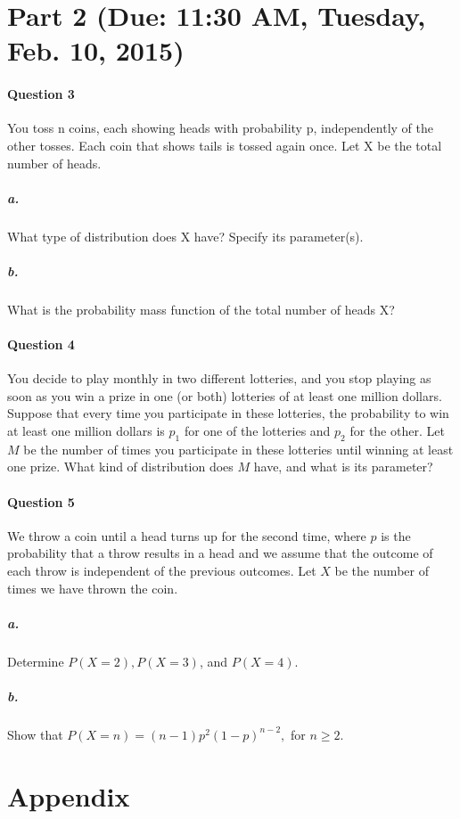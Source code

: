 \documentclass[11pt]{article} %
\begin{document}
\vspace{8em}
\section{Part 2 (Due: 11:30 AM, Tuesday, Feb. 10, 2015)}
\paragraph*{\bf Question 3}
You toss n coins, each showing heads with probability p, independently of the other tosses. Each coin that shows tails is tossed again once. Let X be the total number of heads. 

\subparagraph*{a.} What type of distribution does X have? Specify its parameter(s). 
\subparagraph*{b.} What is the probability mass function of the total number of heads X?

\paragraph*{\bf Question 4}
You decide to play monthly in two different lotteries, and you stop playing as soon as you win a prize in one (or both) lotteries of
at least one million dollars. Suppose that every time you participate in these lotteries, the probability to win at least one million dollars is $p_1$ for one of the lotteries and $p_2$ for the other. Let $M$ be the number of times you participate in these lotteries until winning at least one prize. What kind of distribution does $M$ have, and what is its parameter?

\paragraph*{\bf Question 5}
We throw a coin until a head turns up for the second time, where $p$ is the probability that a throw results in a head and we assume
that the outcome of each throw is independent of the previous outcomes. Let $X$ be the number of times we have thrown the coin.
\subparagraph*{a.} Determine $P(X = 2), P(X = 3)$, and $P(X = 4)$.
\subparagraph*{b.} Show that $P(X = n) = (n - 1)p^2(1-p)^{n-2},$ for $n \ge 2.$

\newpage

\section*{\bf Appendix}
\end{document}
